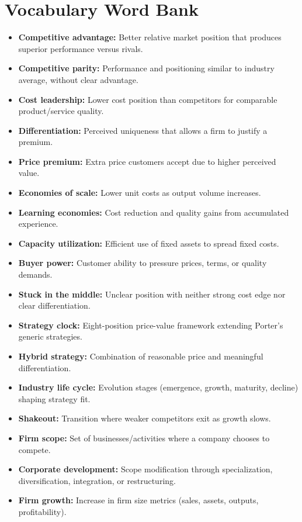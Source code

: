 \documentclass[10pt,a4paper]{article}
\begin{document}
\section*{Vocabulary Word Bank}
\begin{itemize}
  \item \textbf{Competitive advantage:} Better relative market position that produces superior performance versus rivals.
  \item \textbf{Competitive parity:} Performance and positioning similar to industry average, without clear advantage.
  \item \textbf{Cost leadership:} Lower cost position than competitors for comparable product/service quality.
  \item \textbf{Differentiation:} Perceived uniqueness that allows a firm to justify a premium.
  \item \textbf{Price premium:} Extra price customers accept due to higher perceived value.
  \item \textbf{Economies of scale:} Lower unit costs as output volume increases.
  \item \textbf{Learning economies:} Cost reduction and quality gains from accumulated experience.
  \item \textbf{Capacity utilization:} Efficient use of fixed assets to spread fixed costs.
  \item \textbf{Buyer power:} Customer ability to pressure prices, terms, or quality demands.
  \item \textbf{Stuck in the middle:} Unclear position with neither strong cost edge nor clear differentiation.
  \item \textbf{Strategy clock:} Eight-position price-value framework extending Porter’s generic strategies.
  \item \textbf{Hybrid strategy:} Combination of reasonable price and meaningful differentiation.
  \item \textbf{Industry life cycle:} Evolution stages (emergence, growth, maturity, decline) shaping strategy fit.
  \item \textbf{Shakeout:} Transition where weaker competitors exit as growth slows.
  \item \textbf{Firm scope:} Set of businesses/activities where a company chooses to compete.
  \item \textbf{Corporate development:} Scope modification through specialization, diversification, integration, or restructuring.
  \item \textbf{Firm growth:} Increase in firm size metrics (sales, assets, outputs, profitability).

\end{itemize}
\end{document}

